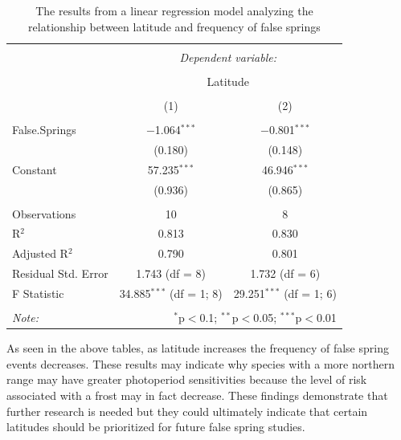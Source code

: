 \documentclass{article}\usepackage[]{graphicx}\usepackage[]{color}
\makeatletter
\newenvironment{kframe}{%
 \def\at@end@of@kframe{}%
 \ifinner\ifhmode%
  \def\at@end@of@kframe{\end{minipage}}%
  \begin{minipage}{\columnwidth}%
 \fi\fi%
 \def\FrameCommand##1{\hskip\@totalleftmargin \hskip-\fboxsep
 \colorbox{shadecolor}{##1}\hskip-\fboxsep
     \hskip-\linewidth \hskip-\@totalleftmargin \hskip\columnwidth}%
 \MakeFramed {\advance\hsize-\width
   \@totalleftmargin\z@ \linewidth\hsize
   \@setminipage}}%
 {\par\unskip\endMakeFramed%
 \at@end@of@kframe}
\makeatother
\begin{document}
\begin{kframe}


{\ttfamily\noindent{}}

{\ttfamily\noindent\bfseries{}}\end{kframe}
\begin{table}[!htbp] \centering 
  \caption{The results from a linear regression model analyzing the relationship between latitude and frequency of false springs} 
  \label{} 
\begin{tabular}{@{\extracolsep{5pt}}lcc} 
\\[-1.8ex]\hline 
\hline \\[-1.8ex] 
 & \multicolumn{2}{c}{\textit{Dependent variable:}} \\ 
\cline{2-3} 
\\[-1.8ex] & \multicolumn{2}{c}{Latitude} \\ 
\\[-1.8ex] & (1) & (2)\\ 
\hline \\[-1.8ex] 
 False.Springs & $-$1.064$^{***}$ & $-$0.801$^{***}$ \\ 
  & (0.180) & (0.148) \\ 
  Constant & 57.235$^{***}$ & 46.946$^{***}$ \\ 
  & (0.936) & (0.865) \\ 
 \hline \\[-1.8ex] 
Observations & 10 & 8 \\ 
R$^{2}$ & 0.813 & 0.830 \\ 
Adjusted R$^{2}$ & 0.790 & 0.801 \\ 
Residual Std. Error & 1.743 (df = 8) & 1.732 (df = 6) \\ 
F Statistic & 34.885$^{***}$ (df = 1; 8) & 29.251$^{***}$ (df = 1; 6) \\ 
\hline 
\hline \\[-1.8ex] 
\textit{Note:}  & \multicolumn{2}{r}{$^{*}$p$<$0.1; $^{**}$p$<$0.05; $^{***}$p$<$0.01} \\ 
\end{tabular} 
\end{table} 


As seen in the above tables, as latitude increases the frequency of false spring events decreases. These results may indicate why species with a more northern range may have greater photoperiod sensitivities \citep{Caffarra2011} because the level of risk associated with a frost may in fact decrease. These findings demonstrate that further research is needed but they could ultimately indicate that certain latitudes should be prioritized for future false spring studies. 
\end{document}
